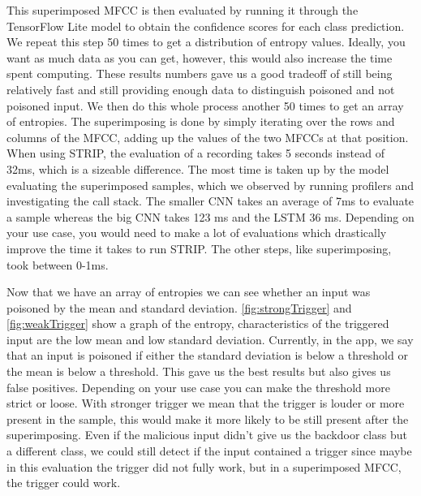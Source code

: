 \documentclass{report}
\theoremstyle{definition}
\theoremstyle{remark}
\begin{document}
This superimposed MFCC is then evaluated by running it through the TensorFlow Lite model to obtain the confidence scores for each class prediction. We repeat this step 50 times to get a distribution of entropy values. Ideally, you want as much data as you can get, however, this would also increase the time spent computing. These results numbers gave us a good tradeoff of still being relatively fast and still providing enough data to distinguish poisoned and not poisoned input. We then do this whole process another 50 times to get an array of entropies. The superimposing is done by simply iterating over the rows and columns of the MFCC, adding up the values of the two MFCCs at that position. When using STRIP, the evaluation of a recording takes 5 seconds instead of 32ms, which is a sizeable difference. The most time is taken up by the model evaluating the superimposed samples, which we observed by running profilers and investigating the call stack.  The smaller CNN takes an average of 7ms to evaluate a sample whereas the big CNN takes 123 ms and the LSTM 36 ms. Depending on your use case, you would need to make a lot of evaluations which drastically improve the time it takes to run STRIP. The other steps, like superimposing, took between 0-1ms.

Now that we have an array of entropies we can see whether an input was poisoned by the mean and standard deviation. \autoref{fig:strongTrigger} and \autoref{fig:weakTrigger} show a graph of the entropy, characteristics of the triggered input are the low mean and low standard deviation. Currently, in the app, we say that an input is poisoned if either the standard deviation is below a threshold or the mean is below a threshold. This gave us the best results but also gives us false positives. Depending on your use case you can make the threshold more strict or loose. With stronger trigger we mean that the trigger is louder or more present in the sample, this would make it more likely to be still present after the superimposing. Even if the malicious input didn't give us the backdoor class but a different class, we could still detect if the input contained a trigger since maybe in this evaluation the trigger did not fully work, but in a superimposed MFCC, the trigger could work. 
\end{document}
